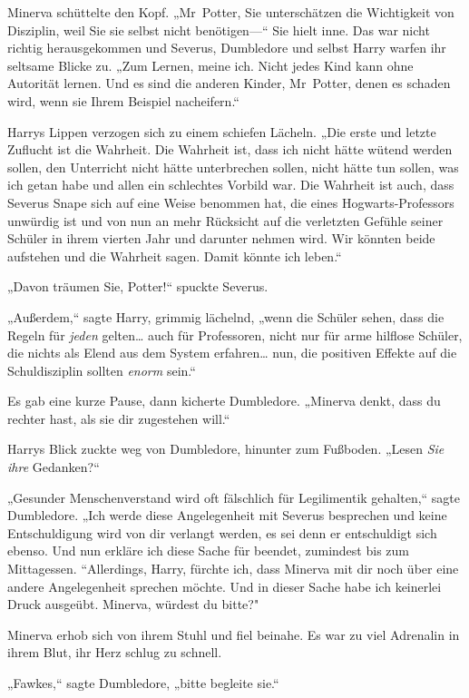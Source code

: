 {Minerva schüttelte den Kopf. „Mr~Potter, Sie unterschätzen die Wichtigkeit von Disziplin, weil Sie sie selbst nicht benötigen—“ Sie hielt inne. Das war nicht richtig herausgekommen und Severus, Dumbledore und selbst Harry warfen ihr seltsame Blicke zu. „Zum Lernen, meine ich. Nicht jedes Kind kann ohne Autorität lernen. Und es sind die anderen Kinder, Mr~Potter, denen es schaden wird, wenn sie Ihrem Beispiel nacheifern.“

Harrys Lippen verzogen sich zu einem schiefen Lächeln. „Die erste und letzte Zuflucht ist die Wahrheit. Die Wahrheit ist, dass ich nicht hätte wütend werden sollen, den Unterricht nicht hätte unterbrechen sollen, nicht hätte tun sollen, was ich getan habe und allen ein schlechtes Vorbild war. Die Wahrheit ist auch, dass Severus Snape sich auf eine Weise benommen hat, die eines Hogwarts-Professors unwürdig ist und von nun an mehr Rücksicht auf die verletzten Gefühle seiner Schüler in ihrem vierten Jahr und darunter nehmen wird. Wir könnten beide aufstehen und die Wahrheit sagen. Damit könnte ich leben.“

„Davon träumen Sie, Potter!“ spuckte Severus.

„Außerdem,“ sagte Harry, grimmig lächelnd, „wenn die Schüler sehen, dass die Regeln für \emph{jeden} gelten… auch für Professoren, nicht nur für arme hilflose Schüler, die nichts als Elend aus dem System erfahren… nun, die positiven Effekte auf die Schuldisziplin sollten \emph{enorm} sein.“

Es gab eine kurze Pause, dann kicherte Dumbledore. „Minerva denkt, dass du rechter hast, als sie dir zugestehen will.“

Harrys Blick zuckte weg von Dumbledore, hinunter zum Fußboden. „Lesen \emph{Sie ihre} Gedanken?“

„Gesunder Menschenverstand wird oft fälschlich für Legilimentik gehalten,“ sagte Dumbledore. „Ich werde diese Angelegenheit mit Severus besprechen und keine Entschuldigung wird von dir verlangt werden, es sei denn er entschuldigt sich ebenso. Und nun erkläre ich diese Sache für beendet, zumindest bis zum Mittagessen. “Allerdings, Harry, fürchte ich, dass Minerva mit dir noch über eine andere Angelegenheit sprechen möchte. Und in dieser Sache habe ich keinerlei Druck ausgeübt. Minerva, würdest du bitte?"

Minerva erhob sich von ihrem Stuhl und fiel beinahe. Es war zu viel Adrenalin in ihrem Blut, ihr Herz schlug zu schnell.

„Fawkes,“ sagte Dumbledore, „bitte begleite sie.“

}
